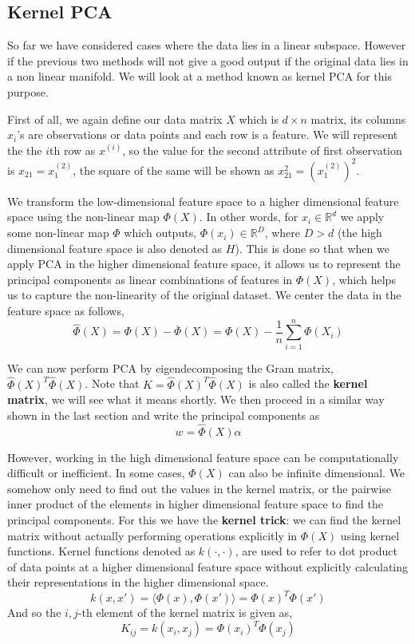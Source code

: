 \documentclass[12pt,a4paper]{article}
\begin{document}
\subsection{Kernel PCA}
So far we have considered cases where the data lies in a linear subspace. However if the previous two methods will not give  a good output if the original data lies in a non linear manifold. We will look at a method known as kernel PCA for this purpose. 

First of all, we again define our data matrix $X$ which is $d \times n$ matrix, its columns $x_i$'s are observations or data points and each row is a feature. We will represent the the $i$th row as $x^{(i)}$, so the value for the second attribute of first observation is $x_{21} = x_{1}^{(2)}$, the square of the same will be shown as $x_{21}^2 = (x_{1}^{(2)})^2$.

We transform the low-dimensional feature space to a higher dimensional feature space using the non-linear map $\Phi(X)$. In other words, for $x_i \in \mathbb{R}^d$ we apply some non-linear map $\Phi$ which outputs, $\Phi(x_i) \in \mathbb{R}^D$, where $D>d$ (the high dimensional feature space is also denoted as $H$). This is done so that when we apply PCA in the higher dimensional feature space, it allows us to represent the principal components as linear combinations of features in $\Phi(X)$, which helps us to capture the non-linearity of the original dataset. We center the data in the feature space as follows, 
$$\hat{\Phi}(X) = \Phi(X) - \bar{\Phi}(X)= \Phi(X) - \dfrac{1}{n} \sum_{i=1}^n \Phi(X_i)$$

We can now perform PCA by eigendecomposing the Gram matrix, $\hat{\Phi}(X)^T\hat{\Phi}(X)$. Note that $K=\hat{\Phi}(X)^T\hat{\Phi}(X)$ is also called the \textbf{kernel matrix}, we will see what it means shortly. We then proceed in a similar way shown in the last section and write the principal components as $$w = \hat{\Phi}(X)\alpha$$


However, working in the high dimensional feature space can be computationally difficult or inefficient. In some cases, $\Phi(X)$ can also be infinite dimensional. We somehow only need to find out the values in the kernel matrix, or the pairwise inner product of the elements in higher dimensional feature space to find the principal components. For this we have the \textbf{kernel trick}: we can find the kernel matrix without actually performing operations explicitly in $\Phi(X)$ using kernel functions. Kernel functions denoted as $k(\cdot,\cdot)$, are used to refer to dot product of data points at a higher dimensional feature space without explicitly calculating their representations in the higher dimensional space. $$k(x,x') = \langle \Phi(x),\Phi(x') \rangle =\Phi(x)^T\Phi(x')$$
And so the $i,j$-th element of the kernel matrix is given as, $$K_{ij} = k(x_i,x_j) = \Phi(x_i)^T\Phi(x_j)$$
\end{document}
